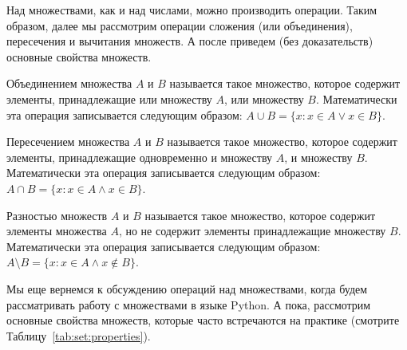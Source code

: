 Над множествами, как и над числами, можно производить операции. Таким образом, далее мы рассмотрим 
операции сложения (или объединения), пересечения и вычитания множеств. А после приведем (без доказательств) основные свойства множеств.

\begin{definition}
Объединением множества $A$ и $B$ называется такое множество, которое 
содержит элементы, принадлежащие или множеству $A$, или множеству $B$. 
Математически эта операция записывается следующим образом:
$A \cup B = \{x: x \in A \vee x \in B\}$.
\end{definition}

\begin{definition}
Пересечением множества $A$ и $B$ называется такое множество, которое
содержит элементы, принадлежащие одновременно и множеству $A$, и 
множеству $B$. Математически эта операция записывается следующим образом:
$A \cap B = \{x: x \in A \wedge x \in B\}$.
\end{definition}

\begin{definition}
Разностью множеств $A$ и $B$ называется такое множество, которое
содержит элементы множества $A$, но не содержит элементы принадлежащие  
множеству $B$. Математически эта операция записывается следующим образом:
$A \setminus B = \{x: x \in A \wedge x \notin B\}$.
\end{definition}

Мы еще вернемся к обсуждению операций над множествами, когда будем рассматривать 
работу с множествами в языке Python. А пока, рассмотрим основные свойства 
множеств, которые часто встречаются на практике (смотрите 
Таблицу~\ref{tab:set:properties}).

